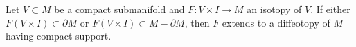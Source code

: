 Let $V \subset M$ be a compact submanifold and $F: V \times I \rightarrow M$ an isotopy of $V$. If either $F(V \times I) \subset \partial M$ or $F(V \times I) \subset M - \partial M$, then $F$ extends to a diffeotopy of $M$ having compact support.

